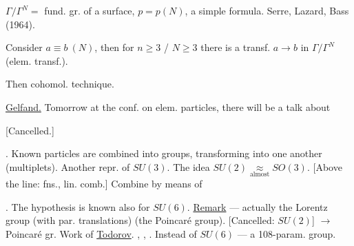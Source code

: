 $\Gamma/\Gamma^{N}=$ fund. gr. of a surface,
$p=p(N)$, a simple formula.
Serre, Lazard, Bass (1964).
\par\noindent\begin{minipage}{\linewidth}
Consider $a\equiv b\ (N)$, then for $n\geq3$ / $N\geq3$
there is a transf. $a\to b$ in $\Gamma/\Gamma^{N}$ (elem. transf.).
\end{minipage}\par
Then cohomol. technique.

\underline{Gelfand.}
Tomorrow at the conf. on elem. particles, there will be a talk about
\par\noindent\begin{minipage}{\linewidth}
[Cancelled.]
\end{minipage}\par
{}.
Known particles are combined into groups, transforming into one another (multiplets).
Another repr. of $SU(3)$.
The idea $SU(2)\underset{\text{almost}}{\approx}SO(3)$.
[Above the line: fns., lin. comb.]
Combine by means of .
The hypothesis is known also for $SU(6)$.
\underline{Remark} --- actually the Lorentz group (with par. translations)
(the Poincar\'e group).
[Cancelled: $SU(2)$] $\longrightarrow$ Poincar\'e gr.
Work of \underline{Todorov}.
, , .
Instead of $SU(6)$ --- a 108-param. group.

